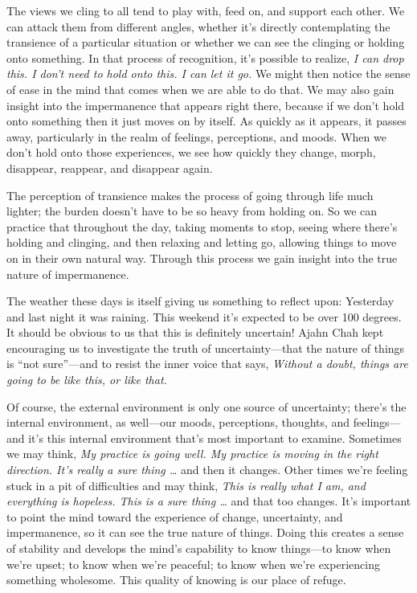 The views we cling to all tend to play with, feed on, and support each 
other. We can attack them from different angles, whether it's directly 
contemplating the transience of a particular situation or whether we 
can see the clinging or holding onto something. In that process of 
recognition, it's possible to realize, \emph{I can drop this. I don't 
need to hold onto this. I can let it go.} We might then notice the 
sense of ease in the mind that comes when we are able to do that. We 
may also gain insight into the impermanence that appears right there, 
because if we don't hold onto something then it just moves on by 
itself. As quickly as it appears, it passes away, particularly in the 
realm of feelings, perceptions, and moods. When we don't hold onto 
those experiences, we see how quickly they change, morph, disappear, 
reappear, and disappear again.

The perception of transience makes the process of going through life 
much lighter; the burden doesn't have to be so heavy from holding on. 
So we can practice that throughout the day, taking moments to stop, 
seeing where there's holding and clinging, and then relaxing and 
letting go, allowing things to move on in their own natural way. 
Through this process we gain insight into the true nature of 
impermanence.


The weather these days is itself giving us something to reflect upon: 
Yesterday and last night it was raining. This weekend it's expected to 
be over 100 degrees. It should be obvious to us that this is definitely 
uncertain! Ajahn Chah kept encouraging us to investigate the truth of 
uncertainty---that the nature of things is ``not sure''---and to resist 
the inner voice that says, \emph{Without a doubt, things are going to 
be like this, or like that.}

Of course, the external environment is only one source of uncertainty; 
there's the internal environment, as well---our moods, perceptions, 
thoughts, and feelings---and it's this internal environment that's most 
important to examine. Sometimes we may think, \emph{My practice is 
going well. My practice is moving in the right direction. It's really a 
sure thing \ldots{}} and then it changes. Other times we're feeling 
stuck in a pit of difficulties and may think, \emph{This is really what 
I am, and everything is hopeless. This is a sure thing \ldots{}} and 
that too changes. It's important to point the mind toward the 
experience of change, uncertainty, and impermanence, so it can see the 
true nature of things. Doing this creates a sense of stability and 
develops the mind's capability to know things---to know when we're 
upset; to know when we're peaceful; to know when we're experiencing 
something wholesome. This quality of knowing is our place of refuge.

